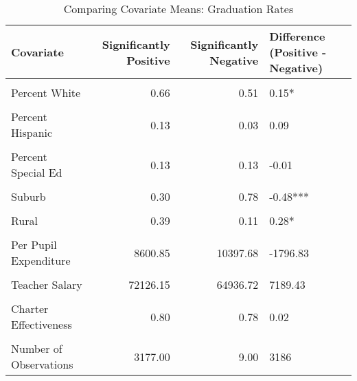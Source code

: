 \begin{table}[!h]
\centering
\caption{\label{tab:cov_means_afgr}Comparing Covariate Means: Graduation Rates}
\centering
\begin{tabular}[t]{lrrl}
\toprule
Covariate & Significantly 
 Positive & Significantly 
 Negative & Difference 
 (Positive - Negative)\\
\midrule
\cellcolor{gray!10}{Log of Enrollment} & \cellcolor{gray!10}{8.02} & \cellcolor{gray!10}{7.77} & \cellcolor{gray!10}{0.25}\\
Percent White & 0.66 & 0.51 & 0.15*\\
\cellcolor{gray!10}{Percent Black} & \cellcolor{gray!10}{0.17} & \cellcolor{gray!10}{0.42} & \cellcolor{gray!10}{-0.25***}\\
Percent Hispanic & 0.13 & 0.03 & 0.09\\
\cellcolor{gray!10}{Percent Free/Reduced Lunch} & \cellcolor{gray!10}{0.32} & \cellcolor{gray!10}{0.44} & \cellcolor{gray!10}{-0.12*}\\
Percent Special Ed & 0.13 & 0.13 & -0.01\\
\cellcolor{gray!10}{Urban} & \cellcolor{gray!10}{0.14} & \cellcolor{gray!10}{0.00} & \cellcolor{gray!10}{0.14}\\
Suburb & 0.30 & 0.78 & -0.48***\\
\cellcolor{gray!10}{Town} & \cellcolor{gray!10}{0.17} & \cellcolor{gray!10}{0.11} & \cellcolor{gray!10}{0.06}\\
Rural & 0.39 & 0.11 & 0.28*\\
\cellcolor{gray!10}{Per Pupil Revenue} & \cellcolor{gray!10}{8536.88} & \cellcolor{gray!10}{10076.27} & \cellcolor{gray!10}{-1539.39}\\
Per Pupil Expenditure & 8600.85 & 10397.68 & -1796.83\\
\cellcolor{gray!10}{Student-Teacher Ratio} & \cellcolor{gray!10}{16.17} & \cellcolor{gray!10}{15.52} & \cellcolor{gray!10}{0.65}\\
Teacher Salary & 72126.15 & 64936.72 & 7189.43\\
\cellcolor{gray!10}{Number of Magnet Schools} & \cellcolor{gray!10}{0.10} & \cellcolor{gray!10}{0.11} & \cellcolor{gray!10}{-0.01}\\
Charter Effectiveness & 0.80 & 0.78 & 0.02\\
\cellcolor{gray!10}{Baseline Performance} & \cellcolor{gray!10}{0.76} & \cellcolor{gray!10}{0.82} & \cellcolor{gray!10}{-0.07}\\
\midrule
Number of Observations & 3177.00 & 9.00 & 3186\\
\bottomrule
\end{tabular}
\end{table}
